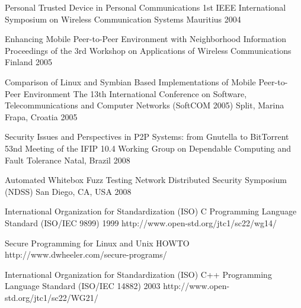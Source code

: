 \begin{thebibliography}{9}
		{
			\BibAnd
			\BibAnd
			\BibAnd
			\BibAnd
			\BibAnd
			\BibAnd
			}
		{Personal Trusted Device in Personal Communications}
		{1st {IEEE} International Symposium on Wireless Communication Systems}
		{Mauritius}
		{2004}
	
		{
			\BibAnd
			}
		{Enhancing Mobile Peer-to-Peer Environment with Neighborhood Information}
		{Proceedings of the 3rd Workshop on Applications of Wireless Communications}
		{Finland}
		{2005}
	
		{
			\BibAnd
			\BibAnd
			}
		{Comparison of {L}inux and {S}ymbian Based Implementations of Mobile Peer-to-Peer Environment}
		{The 13th International Conference on Software, Telecommunications and Computer Networks ({SoftCOM} 2005)}
		{Split, Marina Frapa, Croatia}
		{2005}
	
		{}
		{Security Issues and Perspectives in P2P Systems: from Gnutella to BitTorrent}
		{53nd Meeting of the IFIP 10.4 Working Group on Dependable Computing and Fault Tolerance}
		{Natal, Brazil}
		{2008}
	
		{
			\BibAnd
			\BibAnd
			}
		{Automated Whitebox Fuzz Testing}
		{Network Distributed Security Symposium ({NDSS})}
		{San Diego, CA, USA}
		{2008}


		{International Organization for Standardization (ISO)}
		{{C} Programming Language Standard ({ISO/IEC} 9899)}
		{1999}
		{http://www.open-std.org/jtc1/sc22/wg14/}
		
		{}
		{Secure Programming for {L}inux and {U}nix {HOWTO}}
		{}
		{http://www.dwheeler.com/secure-programs/}
		
		{International Organization for Standardization (ISO)}
		{{C++} Programming Language Standard ({ISO/IEC} 14882)}
		{2003}
		{http://www.open-std.org/jtc1/sc22/WG21/}
		

\end{thebibliography}
